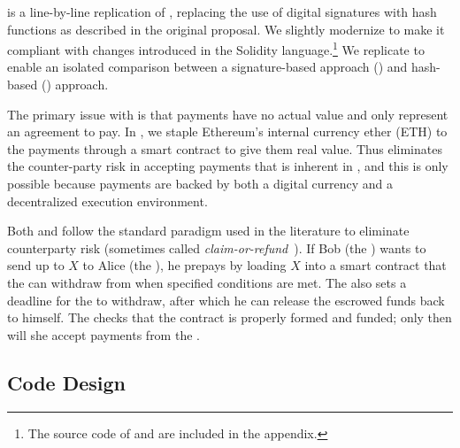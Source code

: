 \ew is a line-by-line replication of \fifty, replacing the use of digital signatures with hash functions as described in the original \pw proposal. We slightly modernize \fifty to make it compliant with changes introduced in the Solidity language.\footnote{The source code of \fifty and \ew are included in the appendix.} We replicate \fifty to enable an isolated comparison between a signature-based approach (\fifty) and hash-based (\ew) approach.

The primary issue with \pw is that payments have no actual value and only represent an agreement to pay. In \ew, we staple Ethereum's internal currency ether (ETH) to the payments through a smart contract to give them real value. Thus \ew eliminates the counter-party risk in accepting payments that is inherent in \pw, and this is only possible because payments are backed by both a digital currency and a decentralized execution environment.

Both \fifty and \ew follow the standard paradigm used in the literature to eliminate counterparty risk (sometimes called \textit{claim-or-refund}~\cite{BK14}). If Bob (the \make) wants to send up to $X$ \eth to Alice (the \take), he prepays by loading $X$ \eth into a smart contract that the \take can withdraw from when specified conditions are met. The \make also sets a deadline for the \take to withdraw, after which he can release the escrowed funds back to himself. The \take checks that the contract is properly formed and funded; only then will she accept payments from the \make.

\subsection{\ew Code Design} 

